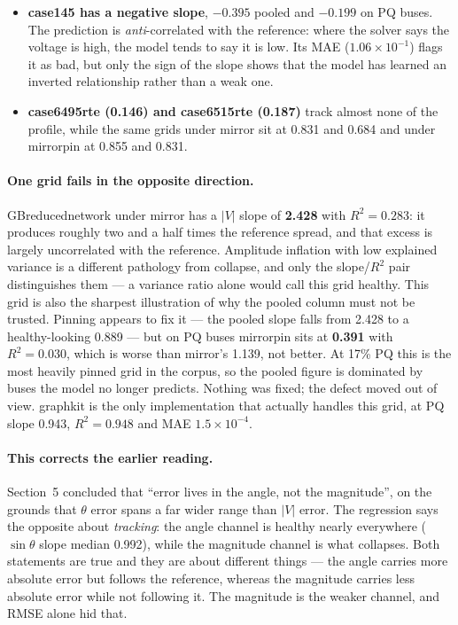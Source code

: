 \documentclass[10pt]{article}
\begin{document}
\begin{itemize}
\item \textbf{case145 has a negative slope}, $-0.395$ pooled and $-0.199$ on PQ
buses. The prediction is \emph{anti}-correlated with the reference: where the
solver says the voltage is high, the model tends to say it is low. Its MAE
($1.06\times10^{-1}$) flags it as bad, but only the sign of the slope shows that
the model has learned an inverted relationship rather than a weak one.
\item \textbf{case6495rte (0.146) and case6515rte (0.187)} track almost none of
the profile, while the same grids under mirror sit at 0.831 and 0.684 and under
mirrorpin at 0.855 and 0.831.
\end{itemize}

\paragraph{One grid fails in the opposite direction.} GBreducednetwork under
mirror has a $|V|$ slope of \textbf{2.428} with $R^2 = 0.283$: it produces
roughly two and a half times the reference spread, and that excess is largely
uncorrelated with the reference. Amplitude inflation with low explained variance
is a different pathology from collapse, and only the slope/$R^2$ pair
distinguishes them --- a variance ratio alone would call this grid healthy.
This grid is also the sharpest illustration of why the pooled column must not be
trusted. Pinning appears to fix it --- the pooled slope falls from 2.428 to a
healthy-looking 0.889 --- but on PQ buses mirrorpin sits at \textbf{0.391} with
$R^2 = 0.030$, which is worse than mirror's 1.139, not better. At 17\% PQ this
is the most heavily pinned grid in the corpus, so the pooled figure is dominated
by buses the model no longer predicts. Nothing was fixed; the defect moved out
of view. graphkit is the only implementation that actually handles this grid,
at PQ slope 0.943, $R^2 = 0.948$ and MAE $1.5\times10^{-4}$.

\paragraph{This corrects the earlier reading.} Section~5 concluded that ``error
lives in the angle, not the magnitude'', on the grounds that $\theta$ error
spans a far wider range than $|V|$ error. The regression says the opposite about
\emph{tracking}: the angle channel is healthy nearly everywhere
($\sin\theta$ slope median 0.992), while the magnitude channel is what
collapses. Both statements are true and they are about different things --- the
angle carries more absolute error but follows the reference, whereas the
magnitude carries less absolute error while not following it. The magnitude is
the weaker channel, and RMSE alone hid that.
\end{document}
